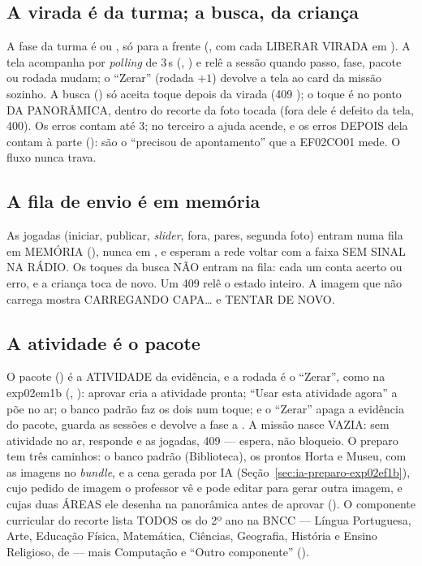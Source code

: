 \subsection{A virada é da turma; a busca, da criança}

A fase da turma é  ou , só para a frente
(, com cada LIBERAR VIRADA em
). A tela acompanha por \emph{polling} de 3\,s
(, ) e relê a sessão quando passo,
fase, pacote ou rodada mudam; o \enquote{Zerar} (rodada $+1$) devolve a tela
ao card da missão sozinho. A busca () só aceita
toque depois da virada (409 ); o toque é no ponto DA
PANORÂMICA, dentro do recorte da foto tocada (fora dele é defeito da tela,
400). Os erros contam até 3; no terceiro a ajuda acende, e os erros DEPOIS
dela contam à parte (): são o
\enquote{precisou de apontamento} que a EF02CO01 mede. O fluxo nunca trava.

\subsection{A fila de envio é em memória}

As jogadas (iniciar, publicar, \emph{slider}, fora, pares, segunda foto)
entram numa fila em MEMÓRIA (), nunca em ,
e esperam a rede voltar com a faixa SEM SINAL NA RÁDIO. Os toques da busca NÃO
entram na fila: cada um conta acerto ou erro, e a criança toca de novo. Um
409 relê o estado inteiro. A imagem que não carrega mostra CARREGANDO
CAPA\ldots{} e TENTAR DE NOVO.

\subsection{A atividade é o pacote}

O pacote () é a ATIVIDADE da evidência, e a rodada é o
\enquote{Zerar}, como na exp02em1b (, ): aprovar
cria a atividade pronta; \enquote{Usar esta atividade agora} a põe no ar; o
banco padrão faz os dois num toque; e o \enquote{Zerar} apaga a evidência do
pacote, guarda as sessões e devolve a fase a . A missão nasce
VAZIA: sem atividade no ar,  responde
 e as jogadas, 409  --- espera, não
bloqueio. O preparo tem três caminhos: o banco padrão (Biblioteca), os prontos
Horta e Museu, com as imagens no \emph{bundle}, e a cena gerada por IA
(Seção~\ref{sec:ia-preparo-exp02ef1b}), cujo pedido de imagem o professor
vê e pode editar para gerar outra imagem, e cujas duas ÁREAS ele desenha na
panorâmica antes de aprovar (). O componente curricular do recorte
lista TODOS os do 2º ano na BNCC --- Língua Portuguesa, Arte, Educação
Física, Matemática, Ciências, Geografia, História e Ensino Religioso, de
 --- mais Computação e \enquote{Outro
componente} ().

